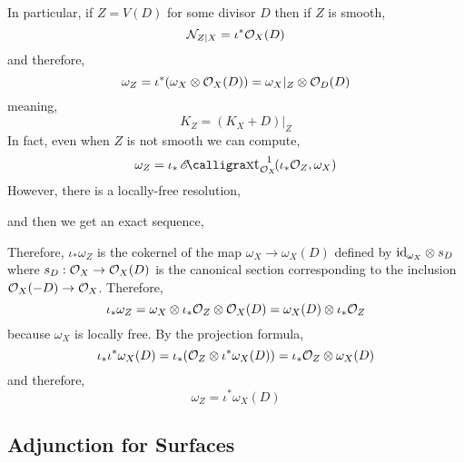 \documentclass[12pt]{article}
\begin{document}
In particular, if $Z = V(D)$ for some divisor $D$ then if $Z$ is smooth,
\[ \mathcal{N}_{Z | X} = \iota^* \mathcal{O}_{X}(D) \]
and therefore,
\[ \omega_Z = \iota^* (\omega_X \otimes \mathcal{O}_{X}(D)) = \omega_X |_Z \otimes \mathcal{O}_{D}(D) \]
meaning,
\[ K_Z = (K_X + D)|_Z \]
In fact, even when $Z$ is not smooth we can compute,
\[ \omega_Z = \iota_* \shExt{1}{\struct{X}}{\iota_* \struct{Z}}{\omega_X} \]
However, there is a locally-free resolution,
\begin{center}
\end{center}
and then we get an exact sequence,
\begin{center}
\end{center}
Therefore, $\iota_* \omega_Z$ is the cokernel of the map $\omega_X \to \omega_X(D)$ defined by $\mathrm{id}_{\omega_X} \otimes s_D$ where $s_D : \mathcal{O}_{X} \to \mathcal{O}_{X}(D)$ is the canonical section corresponding to the inclusion $\mathcal{O}_{X}(-D) \to \mathcal{O}_{X}$. Therefore,
\[ \iota_* \omega_Z = \omega_X \otimes \iota_* \mathcal{O}_{Z} \otimes \mathcal{O}_{X}(D) = \omega_X(D) \otimes \iota_* \mathcal{O}_{Z} \]
because $\omega_X$ is locally free.
By the projection formula, 
\[ \iota_* \iota^* \omega_X(D) = \iota_* (\mathcal{O}_{Z} \otimes \iota^* \omega_X(D)) = \iota_* \mathcal{O}_{Z} \otimes \omega_X(D) \]
and therefore,
\[ \omega_Z = \iota^* \omega_X(D) \]

\subsection{Adjunction for Surfaces}
\end{document}
